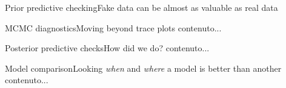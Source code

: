 \documentclass{beamer}
\begin{document}
	\begin{frame}{Prior predictive checking}{Fake data can be almost as valuable as real data}
		
	\end{frame}

	\begin{frame}{MCMC diagnostics}{Moving beyond trace plots}
		contenuto...
	\end{frame}
	
	\begin{frame}{Posterior predictive checks}{How did we do?}
		contenuto...
	\end{frame}

	\begin{frame}{Model comparison}{Looking \textit{when} and \textit{where} a model is better than another}
		contenuto...
	\end{frame}



	
\end{document}
